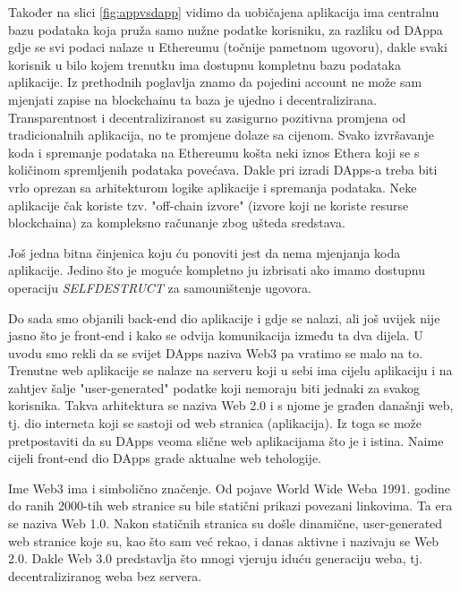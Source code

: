 \documentclass[12pt]{report}
\begin{document}
Također na slici \ref{fig:appvsdapp} vidimo da uobičajena aplikacija ima centralnu bazu podataka koja pruža samo nužne podatke korisniku, za razliku od DAppa gdje se svi podaci nalaze u Ethereumu (točnije pametnom ugovoru), dakle svaki korisnik u bilo kojem trenutku ima dostupnu kompletnu bazu podataka aplikacije. Iz prethodnih poglavlja znamo da pojedini account ne može sam mjenjati zapise na blockchainu ta baza je ujedno i decentralizirana. Transparentnost i decentraliziranost su zasigurno pozitivna promjena od tradicionalnih aplikacija, no te promjene dolaze sa cijenom. Svako izvršavanje koda i spremanje podataka na Ethereumu košta neki iznos Ethera koji se s količinom spremljenih podataka povećava. Dakle pri izradi DApps-a treba biti vrlo oprezan sa arhitekturom logike aplikacije i spremanja podataka. Neke aplikacije čak koriste tzv. "off-chain izvore" (izvore koji ne koriste resurse blockchaina) za kompleksno računanje zbog ušteda sredstava.

Još jedna bitna činjenica koju ću ponoviti jest da nema mjenjanja koda aplikacije. Jedino što je moguće kompletno ju izbrisati ako imamo dostupnu operaciju \emph{SELFDESTRUCT} za samouništenje ugovora.

Do sada smo objanili back-end dio aplikacije i gdje se nalazi, ali još uvijek nije jasno što je front-end i kako se odvija komunikacija između ta dva dijela. U uvodu smo rekli da se svijet DApps naziva Web3 pa vratimo se malo na to. Trenutne web aplikacije se nalaze na serveru koji u sebi ima cijelu aplikaciju i na zahtjev šalje "user-generated" podatke koji nemoraju biti jednaki za svakog korisnika. Takva arhitektura se naziva Web 2.0 i s njome je građen današnji web, tj. dio interneta koji se sastoji od web stranica (aplikacija). Iz toga se može pretpostaviti da su DApps veoma slične web aplikacijama što je i istina. Naime cijeli front-end dio DApps grade aktualne web tehologije.

\begin{tcolorbox}
Ime Web3 ima i simbolično značenje. Od pojave World Wide Weba 1991. godine do ranih 2000-tih web stranice su bile statični prikazi povezani linkovima. Ta era se naziva Web 1.0. Nakon statičnih stranica su došle dinamične, user-generated web stranice koje su, kao što sam već rekao, i danas aktivne i nazivaju se Web 2.0. Dakle Web 3.0 predstavlja što mnogi vjeruju iduću generaciju weba, tj. decentraliziranog weba bez servera.
\end{tcolorbox}
\end{document}

